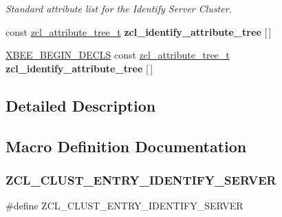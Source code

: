 \begin{DoxyCompactItemize}
\begin{tabbing}
\end{tabbing}\begin{DoxyCompactList}\small\item\em Standard attribute list for the Identify Server Cluster. \end{DoxyCompactList}\item 
const \hyperlink{structzcl__attribute__tree__t}{zcl\+\_\+attribute\+\_\+tree\+\_\+t} {\bfseries zcl\+\_\+identify\+\_\+attribute\+\_\+tree} \mbox{[}$\,$\mbox{]}
\item 
\mbox{\label{group__zcl__identify_ga8a328e26487840e24d43449775060b16}} 
\hyperlink{group__hal_ga336bff4f4a6012aacc4468132bbd3d7f}{X\+B\+E\+E\+\_\+\+B\+E\+G\+I\+N\+\_\+\+D\+E\+C\+LS} const \hyperlink{structzcl__attribute__tree__t}{zcl\+\_\+attribute\+\_\+tree\+\_\+t} {\bfseries zcl\+\_\+identify\+\_\+attribute\+\_\+tree} \mbox{[}$\,$\mbox{]}
\end{DoxyCompactItemize}


\subsection{Detailed Description}


\subsection{Macro Definition Documentation}
\mbox{\label{group__zcl__identify_gaeae5b3a460629b095247d160235ec586}} 
\subsubsection{\texorpdfstring{Z\+C\+L\+\_\+\+C\+L\+U\+S\+T\+\_\+\+E\+N\+T\+R\+Y\+\_\+\+I\+D\+E\+N\+T\+I\+F\+Y\+\_\+\+S\+E\+R\+V\+ER}{ZCL\_CLUST\_ENTRY\_IDENTIFY\_SERVER}}
{\footnotesize\ttfamily \#define Z\+C\+L\+\_\+\+C\+L\+U\+S\+T\+\_\+\+E\+N\+T\+R\+Y\+\_\+\+I\+D\+E\+N\+T\+I\+F\+Y\+\_\+\+S\+E\+R\+V\+ER}

